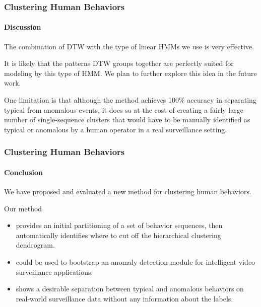 
\begin{frame}
    \frametitle{Clustering Human Behaviors}
    \framesubtitle{Discussion}

    The combination of DTW with the type of linear HMMs we 
    use is very effective. 
    
    \bigskip
    
    It is likely that the patterns DTW groups together are 
    perfectly suited for modeling by this type of HMM. We 
    plan to further explore this idea in the future work.

    \bigskip 

    One limitation is that although the method achieves 100\% accuracy 
    in separating typical from anomalous events, it does so at the cost 
    of creating a fairly large number of single-sequence clusters that 
    would have to be manually identified as typical or anomalous by a 
    human operator in a real surveillance setting.

\end{frame}


\else

\begin{frame}
    \frametitle{Clustering Human Behaviors}
    \framesubtitle{Conclusion}
    
    We have proposed and evaluated a new method for 
    clustering human behaviors.

    \medskip

    Our method
    \begin{itemize}
        \item provides an initial partitioning of a set 
            of behavior sequences, then automatically 
            identifies where to cut off the hierarchical 
            clustering dendrogram.
        \item could be used to bootstrap an anomaly 
            detection module for intelligent video surveillance 
            applications.
        \item shows a desirable separation between typical and 
            anomalous behaviors on real-world surveillance data 
            \alert{without} any information about the labels.
    \end{itemize}

\end{frame}

